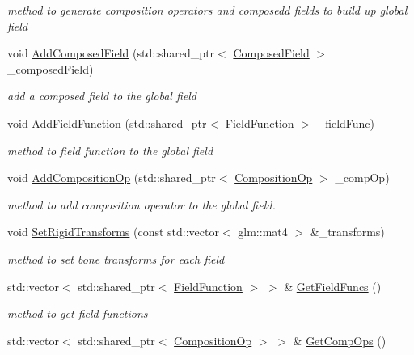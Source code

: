 \begin{DoxyCompactItemize}
\begin{DoxyCompactList}\small\item\em method to generate composition operators and composedd fields to build up global field \end{DoxyCompactList}\item 
void \hyperlink{classGlobalFieldFunction_a9e22015664f10286c786f96dccb24ed4}{Add\+Composed\+Field} (std\+::shared\+\_\+ptr$<$ \hyperlink{classComposedField}{Composed\+Field} $>$ \+\_\+composed\+Field)
\begin{DoxyCompactList}\small\item\em add a composed field to the global field \end{DoxyCompactList}\item 
void \hyperlink{classGlobalFieldFunction_a8fbdf65e403f123aa8e8c7b6e2fad13d}{Add\+Field\+Function} (std\+::shared\+\_\+ptr$<$ \hyperlink{classFieldFunction}{Field\+Function} $>$ \+\_\+field\+Func)
\begin{DoxyCompactList}\small\item\em method to field function to the global field \end{DoxyCompactList}\item 
void \hyperlink{classGlobalFieldFunction_a04591e62e352ff472d2b5c6c8ea1f876}{Add\+Composition\+Op} (std\+::shared\+\_\+ptr$<$ \hyperlink{classCompositionOp}{Composition\+Op} $>$ \+\_\+comp\+Op)
\begin{DoxyCompactList}\small\item\em method to add composition operator to the global field. \end{DoxyCompactList}\item 
void \hyperlink{classGlobalFieldFunction_aa1a3835c54b9b701f65f53c3ffd7f3b6}{Set\+Rigid\+Transforms} (const std\+::vector$<$ glm\+::mat4 $>$ \&\+\_\+transforms)
\begin{DoxyCompactList}\small\item\em method to set bone transforms for each field \end{DoxyCompactList}\item 
std\+::vector$<$ std\+::shared\+\_\+ptr$<$ \hyperlink{classFieldFunction}{Field\+Function} $>$ $>$ \& \hyperlink{classGlobalFieldFunction_ad8bbd29e40c1c71e5756813df01842b5}{Get\+Field\+Funcs} ()\hypertarget{classGlobalFieldFunction_ad8bbd29e40c1c71e5756813df01842b5}{}\label{classGlobalFieldFunction_ad8bbd29e40c1c71e5756813df01842b5}

\begin{DoxyCompactList}\small\item\em method to get field functions \end{DoxyCompactList}\item 
std\+::vector$<$ std\+::shared\+\_\+ptr$<$ \hyperlink{classCompositionOp}{Composition\+Op} $>$ $>$ \& \hyperlink{classGlobalFieldFunction_a4ebe578648d6b852f90c2aab151bfa0a}{Get\+Comp\+Ops} ()\hypertarget{classGlobalFieldFunction_a4ebe578648d6b852f90c2aab151bfa0a}{}\label{classGlobalFieldFunction_a4ebe578648d6b852f90c2aab151bfa0a}


\end{DoxyCompactItemize}
